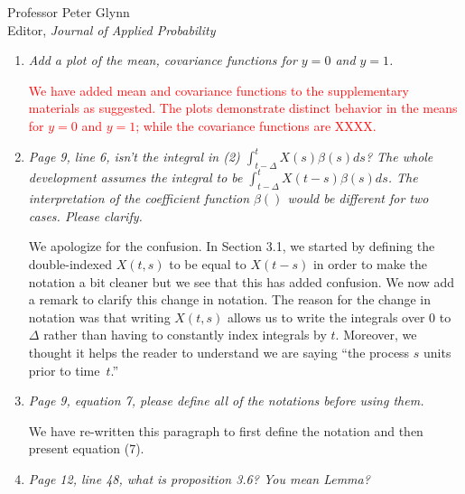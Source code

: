 \documentclass[11pt]{letter} %
\begin{document}
\begin{letter}{Professor
	Peter Glynn\\
	Editor, {\em Journal of Applied Probability}}
\begin{enumerate}
\textcolor{red}{Another reason for treating these two distinctly is that the missing data imputation from XXXX requires distinct covariance functions.  We do think one could marginalize across the two if the mean and covariance functions are not expected to differ greatly and state as such in Section XX (in blue) where we discuss the new Figure XX of the mean and covariance functions for $y=0$ and $y=1$.}
\vspace{5mm}

\item {\it Add a plot of the mean, covariance functions for $y=0$ and $y=1$.}

\vspace{5mm}
\textcolor{red}{We have added mean and covariance functions to the supplementary materials as suggested.  The plots demonstrate distinct behavior in the means for $y=0$ and $y=1$; while the covariance functions are XXXX.}
\vspace{5mm}

\item {\it Page 9, line 6, isn’t the integral in (2) $\int_{t-\Delta}^t X(s) \beta(s)ds$? The whole development assumes the integral to be $\int_{t-\Delta}^t X(t-s) \beta(s)ds$. The interpretation of the coefficient function $\beta()$ would be different for two cases. Please clarify.}

\vspace{5mm}
We apologize for the confusion.  In Section 3.1, we started by defining the double-indexed $X(t,s)$ to be equal to $X(t-s)$ in order to make the notation a bit cleaner but we see that this has added confusion.  We now add a remark to clarify this change in notation.  The reason for the change in notation was that writing $X(t,s)$ allows us to write the integrals over $0$ to $\Delta$ rather than having to constantly index integrals by $t$.  Moreover, we thought it helps the reader to understand we are saying ``the process $s$ units prior to time~$t$.''
\vspace{5mm}

\item {\it Page 9, equation 7, please define all of the notations before using them.}

\vspace{5mm}
We have re-written this paragraph to first define the notation and then present equation (7).
\vspace{5mm}

\item {\it Page 12, line 48, what is proposition 3.6? You mean Lemma?}


\end{enumerate}
\end{letter}
\end{document}
